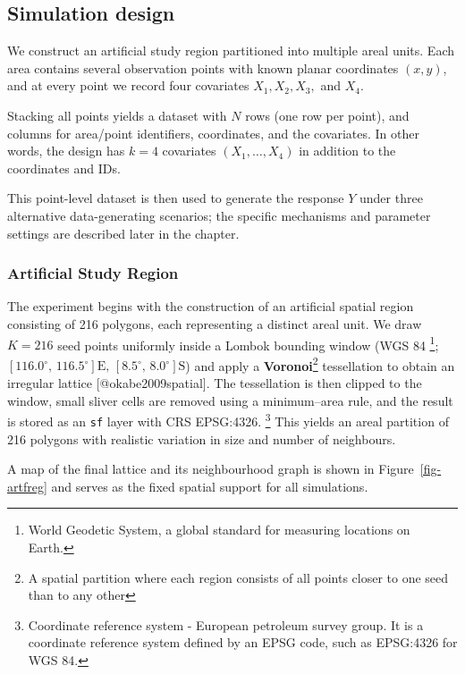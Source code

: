 \documentclass[
  letterpaper,
  DIV=11,
  numbers=noendperiod]{scrartcl}
\begin{document}
\subsection{Simulation design}\label{simulation-design}

We construct an artificial study region partitioned into multiple areal
units. Each area contains several observation points with known planar
coordinates \((x,y)\), and at every point we record four covariates
\(X_1, X_2, X_3,\) and \(X_4\).

Stacking all points yields a dataset with \(N\) rows (one row per
point), and columns for area/point identifiers, coordinates, and the
covariates. In other words, the design has \(k=4\) covariates
\((X_1,\ldots,X_4)\) in addition to the coordinates and IDs.

This point-level dataset is then used to generate the response \(Y\)
under three alternative data-generating scenarios; the specific
mechanisms and parameter settings are described later in the chapter.

\subsubsection{Artificial Study Region}\label{artificial-study-region}

The experiment begins with the construction of an artificial spatial
region consisting of 216 polygons, each representing a distinct areal
unit. We draw \(K=216\) seed points uniformly inside a Lombok bounding
window (WGS 84
\footnote{World Geodetic System, a global standard for measuring locations on Earth.};
\([116.0^\circ,\,116.5^\circ]\mathrm{E},\,[8.5^\circ,\,8.0^\circ]\mathrm{S}\))
and apply a
\textbf{Voronoi}\footnote{A spatial partition where each region consists of all points closer to one seed than to any other}
tessellation to obtain an irregular lattice {[}@okabe2009spatial{]}. The
tessellation is then clipped to the window, small sliver cells are
removed using a minimum--area rule, and the result is stored as an
\texttt{sf} layer with CRS EPSG:4326.
\footnote{Coordinate reference system - European petroleum survey group. It is a coordinate reference system defined by an EPSG code, such as EPSG:4326 for WGS 84.}
This yields an areal partition of 216 polygons with realistic variation
in size and number of neighbours.

A map of the final lattice and its neighbourhood graph is shown in
Figure~\ref{fig-artfreg} and serves as the fixed spatial support for all
simulations.
\end{document}
